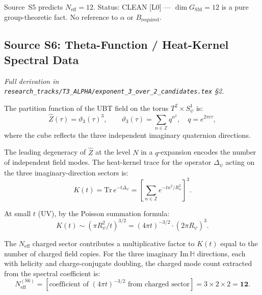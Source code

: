 \documentclass[12pt,a4paper]{article}
\theoremstyle{definition}
\theoremstyle{remark}
\begin{document}
\begin{resultbox}
  Source~S5 predicts $N_{\mathrm{eff}} = 12$.
  Status: CLEAN [L0] — $\dim G_{\mathrm{SM}} = 12$ is a pure group-theoretic fact.
  No reference to $\alpha$ or $B_{\mathrm{required}}$.
\end{resultbox}

\subsection{Source S6: Theta-Function / Heat-Kernel Spectral Data}
\label{ssec:S6}

\textit{Full derivation in \texttt{research\_tracks/T3\_ALPHA/exponent\_3\_over\_2\_candidates.tex} \S2.}

\medskip
The partition function of the UBT field on the torus $T^2\times S^1_\psi$ is:
\begin{equation}
  \widehat{Z}(\tau) = \vartheta_3(\tau)^3,
  \qquad
  \vartheta_3(\tau) = \sum_{n\in\mathbb{Z}} q^{n^2},
  \quad q = e^{2\pi i\tau},
  \label{eq:S6:partition}
\end{equation}
where the cube reflects the three independent imaginary quaternion directions.

The leading degeneracy of $\widehat{Z}$ at the level $N$ in a $q$-expansion
encodes the number of independent field modes.  The heat-kernel trace for
the operator $\Delta_\psi$ acting on the three imaginary-direction sectors is:
\begin{equation}
  K(t) = \mathrm{Tr}\,e^{-t\Delta_\psi}
       = \left[\sum_{n\in\mathbb{Z}} e^{-tn^2/R_\psi^2}\right]^3.
  \label{eq:S6:heatkernel}
\end{equation}

At small $t$ (UV), by the Poisson summation formula:
\begin{equation}
  K(t) \sim \left(\pi R_\psi^2 / t\right)^{3/2}
         = (4\pi t)^{-3/2} \cdot (2\pi R_\psi)^3.
  \label{eq:S6:UV}
\end{equation}

The $N_{\mathrm{eff}}$ charged sector contributes a multiplicative factor to
$K(t)$ equal to the number of charged field copies.  For the three imaginary
Im$\,\mathbb{H}$ directions, each with helicity and charge-conjugate doubling,
the charged mode count extracted from the spectral coefficient is:
\begin{equation}
  N_{\mathrm{eff}}^{(\mathrm{S6})}
  = [\text{coefficient of }(4\pi t)^{-3/2}\text{ from charged sector}]
  = 3 \times 2 \times 2
  = \mathbf{12}.
  \label{eq:S6}
\end{equation}
\end{document}
